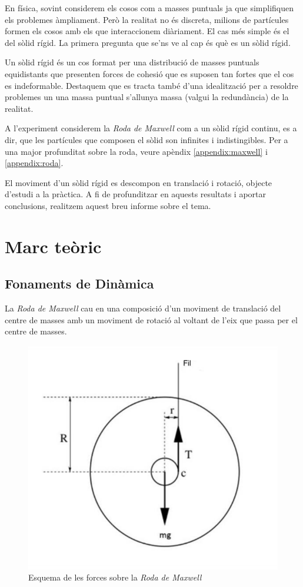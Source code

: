 \documentclass[11pt]{article}
\begin{document}
    \vspace{0.5cm}En física, sovint considerem els cosos com a masses puntuals ja que simplifiquen els problemes àmpliament. Però la realitat no és discreta, milions de partícules formen els cosos amb els que interaccionem diàriament. El cas més simple és el del sòlid rígid. La primera pregunta que se'ns ve al cap és què es un sòlid rígid.

    \vspace{0.5cm}Un sòlid rígid és un cos format per una distribució de masses puntuals equidistants que presenten forces de cohesió que es suposen tan fortes que el cos es indeformable. Destaquem que es tracta també d'una idealització per a resoldre problemes un una massa puntual s'allunya massa (valgui la redundància) de la realitat.

    \vspace{0.5cm}A l'experiment considerem la \textit{Roda de Maxwell} com a un sòlid rígid continu, es a dir, que les partícules que composen el sòlid son infinites i indistingibles. Per a una major profunditat sobre la roda, veure apèndix \ref{appendix:maxwell} i \ref{appendix:roda}.

    \vspace{0.5cm}El moviment d'un sòlid rígid es descompon en translació i rotació, objecte d'estudi a la pràctica. A fi de profunditzar en aquests resultats i aportar conclusions, realitzem aquest breu informe sobre el tema.
    
\section{Marc teòric}
    \subsection{Fonaments de Dinàmica}
        La \textit{Roda de Maxwell} cau en una composició d'un moviment de translació del centre de masses amb un moviment de rotació al voltant de l'eix que passa per el centre de masses.
    
        \begin{figure}
            \vspace{-1.1cm}
            \begin{center}
                \includegraphics[width=.3\textwidth]{fotos/esquema.png} 
            \end{center}
            \vspace{-0.78cm}
            \caption{Esquema de les forces sobre la \textit{Roda de Maxwell}}
            \label{fig:esquema}
        \end{figure}
    
\end{document}
